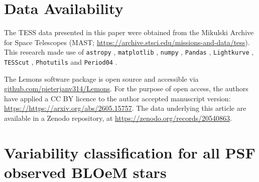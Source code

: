 \documentclass[fleqn,usenatbib]{mnras}
\begin{document}
\section*{Data Availability}

The TESS data presented in this paper were obtained from the Mikulski Archive for Space Telescopes (MAST; \url{https://archive.stsci.edu/missions-and-data/tess}). This research made use of 
{\tt astropy} \citep{astropy}, 
{\tt matplotlib} \citep{matplotlib}, 
{\tt numpy} \citep{numpy}, 
{\tt Pandas} \citep{pandas}, 
{\tt Lightkurve} \citep{Lightkurve,2018_lightkurve}, 
{\tt TESScut} \citep{TESScut_ref}, 
{\tt Photutils} \citep{photutils} and 
{\tt Period04} \citep{period04_2005}.

The {\sc Lemons} software package is open source and accessible via \url{github.com/pieterjanv314/Lemons}. For the purpose of open access, the authors have applied a CC BY licence to the author accepted manuscript version: \url{https://https://arxiv.org/abs/2605.15757}.
The data underlying this article are available in a Zenodo repository, at \url{https://zenodo.org/records/20540863}.









\newpage
\onecolumn

\appendix
\section{Variability classification for all PSF observed BLOeM stars}
\end{document}

